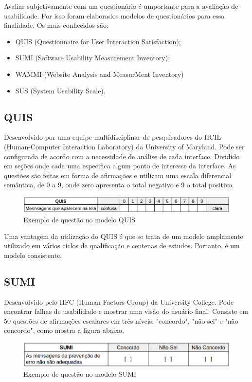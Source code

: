  Avaliar subjetivamente com um questionário é umportante para a avaliação de usabilidade. Por isso foram elaborados modelos de questionários para essa finalidade. Os mais conhecidos são:

 \begin{itemize}
	\item QUIS (Questionnaire for User Interaction Satisfaction);
	\item SUMI (Software Usability Measurement Inventory);
	\item WAMMI (Website Analysis and MeasurMent Inventory)
	\item SUS (System Usability Scale).
\end{itemize}

\subsection{QUIS}
Desenvolvido por uma equipe multidisciplinar de pesquisadores do HCIL (Human-Computer Interaction Laboratory) da University of Maryland. Pode ser configurada de acordo com a necessidade de análise de cada interface. Dividido em seções onde cada uma especifica algum ponto de interesse da interface.
As questões são feitas em forma de afirmações e utilizam uma escala diferencial semântica, de 0 a 9, onde zero apresenta o total negativo e 9 o total positivo.

\begin{figure}[h]
	\centering
	\includegraphics[scale=0.5]{figuras/quis.eps}
	\caption{Exemplo de questão no modelo QUIS}
\end{figure}

Uma vantagem da utilização do QUIS é que se trata de um modelo amplamente utilizado em vários ciclos de qualificação e centenas de estudos. Portanto, é um modelo consistente.

\subsection{SUMI}
Desenvolvido pelo HFC (Human Factors Group) da University College. Pode encontrar falhas de usabilidade e mostrar uma visão do usuário final. Consiste em 50 questões de afirmações escalares em três níveis: "concordo", "não sei" e "não concordo", como mostra a figura abaixo.

\begin{figure}[h]
	\centering
	\includegraphics[scale=0.5]{figuras/sumi.eps}
	\caption{Exemplo de questão no modelo SUMI}
\end{figure}


